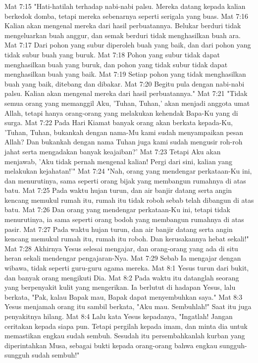 Mat 7:15  "Hati-hatilah terhadap nabi-nabi palsu. Mereka datang kepada kalian berkedok domba, tetapi mereka sebenarnya seperti serigala yang buas.
Mat 7:16  Kalian akan mengenal mereka dari hasil perbuatannya. Belukar berduri tidak mengeluarkan buah anggur, dan semak berduri tidak menghasilkan buah ara.
Mat 7:17  Dari pohon yang subur diperoleh buah yang baik, dan dari pohon yang tidak subur buah yang buruk.
Mat 7:18  Pohon yang subur tidak dapat menghasilkan buah yang buruk, dan pohon yang tidak subur tidak dapat menghasilkan buah yang baik.
Mat 7:19  Setiap pohon yang tidak menghasilkan buah yang baik, ditebang dan dibakar.
Mat 7:20  Begitu pula dengan nabi-nabi palsu. Kalian akan mengenal mereka dari hasil perbuatannya."
Mat 7:21  "Tidak semua orang yang memanggil Aku, 'Tuhan, Tuhan,' akan menjadi anggota umat Allah, tetapi hanya orang-orang yang melakukan kehendak Bapa-Ku yang di surga.
Mat 7:22  Pada Hari Kiamat banyak orang akan berkata kepada-Ku, 'Tuhan, Tuhan, bukankah dengan nama-Mu kami sudah menyampaikan pesan Allah? Dan bukankah dengan nama Tuhan juga kami sudah mengusir roh-roh jahat serta mengadakan banyak keajaiban?'
Mat 7:23  Tetapi Aku akan menjawab, 'Aku tidak pernah mengenal kalian! Pergi dari sini, kalian yang melakukan kejahatan!'"
Mat 7:24  "Nah, orang yang mendengar perkataan-Ku ini, dan menurutinya, sama seperti orang bijak yang membangun rumahnya di atas batu.
Mat 7:25  Pada waktu hujan turun, dan air banjir datang serta angin kencang memukul rumah itu, rumah itu tidak roboh sebab telah dibangun di atas batu.
Mat 7:26  Dan orang yang mendengar perkataan-Ku ini, tetapi tidak menurutinya, ia sama seperti orang bodoh yang membangun rumahnya di atas pasir.
Mat 7:27  Pada waktu hujan turun, dan air banjir datang serta angin kencang memukul rumah itu, rumah itu roboh. Dan kerusakannya hebat sekali!"
Mat 7:28  Akhirnya Yesus selesai mengajar, dan orang-orang yang ada di situ heran sekali mendengar pengajaran-Nya.
Mat 7:29  Sebab Ia mengajar dengan wibawa, tidak seperti guru-guru agama mereka.
Mat 8:1  Yesus turun dari bukit, dan banyak orang mengikuti Dia.
Mat 8:2  Pada waktu itu datanglah seorang yang berpenyakit kulit yang mengerikan. Ia berlutut di hadapan Yesus, lalu berkata, "Pak, kalau Bapak mau, Bapak dapat menyembuhkan saya."
Mat 8:3  Yesus menjamah orang itu sambil berkata, "Aku mau. Sembuhlah!" Saat itu juga penyakitnya hilang.
Mat 8:4  Lalu kata Yesus kepadanya, "Ingatlah! Jangan ceritakan kepada siapa pun. Tetapi pergilah kepada imam, dan minta dia untuk memastikan engkau sudah sembuh. Sesudah itu persembahkanlah kurban yang diperintahkan Musa, sebagai bukti kepada orang-orang bahwa engkau sungguh-sungguh sudah sembuh!"
